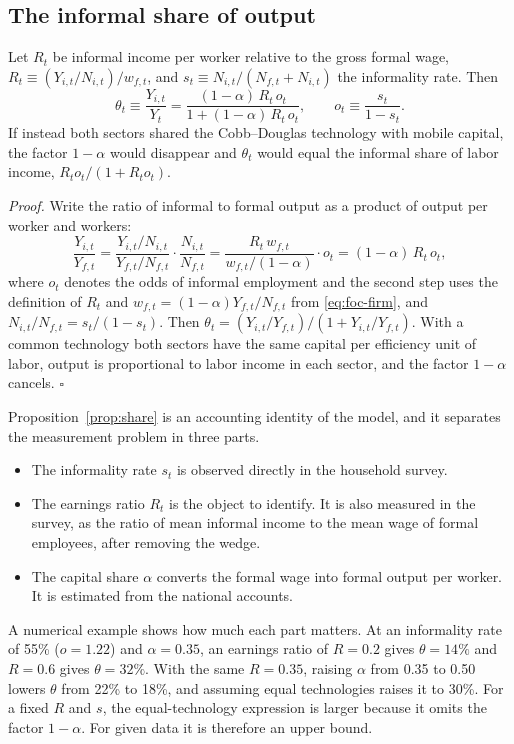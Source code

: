 \subsection{The informal share of output}

\begin{proposition}
\label{prop:share}
Let $R_t$ be informal income per worker relative to the gross formal wage, $R_t \equiv (Y_{i,t}/N_{i,t})/w_{f,t}$, and $s_t \equiv N_{i,t}/(N_{f,t}+N_{i,t})$ the informality rate. Then
\begin{equation}
\theta_t \equiv \frac{Y_{i,t}}{Y_t} = \frac{(1-\alpha)\,R_t\,o_t}{1+(1-\alpha)\,R_t\,o_t},\qquad o_t\equiv\frac{s_t}{1-s_t}.
\label{eq:share}
\end{equation}
If instead both sectors shared the Cobb--Douglas technology with mobile capital, the factor $1-\alpha$ would disappear and $\theta_t$ would equal the informal share of labor income, $R_to_t/(1+R_to_t)$.
\end{proposition}

\emph{Proof.} Write the ratio of informal to formal output as a product of output per worker and workers:
\[
\frac{Y_{i,t}}{Y_{f,t}} = \frac{Y_{i,t}/N_{i,t}}{Y_{f,t}/N_{f,t}}\cdot\frac{N_{i,t}}{N_{f,t}}
= \frac{R_t\,w_{f,t}}{w_{f,t}/(1-\alpha)}\cdot o_t = (1-\alpha)\,R_t\,o_t ,
\]
where $o_t$ denotes the odds of informal employment and the second step uses the definition of $R_t$ and $w_{f,t}=(1-\alpha)Y_{f,t}/N_{f,t}$ from \eqref{eq:foc-firm}, and $N_{i,t}/N_{f,t}=s_t/(1-s_t)$. Then $\theta_t = (Y_{i,t}/Y_{f,t})/(1+Y_{i,t}/Y_{f,t})$. With a common technology both sectors have the same capital per efficiency unit of labor, output is proportional to labor income in each sector, and the factor $1-\alpha$ cancels. $\square$

Proposition~\ref{prop:share} is an accounting identity of the model, and it separates the measurement problem in three parts.
\begin{itemize}
  \item The informality rate $s_t$ is observed directly in the household survey.
  \item The earnings ratio $R_t$ is the object to identify. It is also measured in the survey, as the ratio of mean informal income to the mean wage of formal employees, after removing the wedge.
  \item The capital share $\alpha$ converts the formal wage into formal output per worker. It is estimated from the national accounts.
\end{itemize}
A numerical example shows how much each part matters. At an informality rate of 55\% ($o=1.22$) and $\alpha=0.35$, an earnings ratio of $R=0.2$ gives $\theta=14\%$ and $R=0.6$ gives $\theta=32\%$. With the same $R=0.35$, raising $\alpha$ from 0.35 to 0.50 lowers $\theta$ from 22\% to 18\%, and assuming equal technologies raises it to 30\%. For a fixed $R$ and $s$, the equal-technology expression is larger because it omits the factor $1-\alpha$. For given data it is therefore an upper bound.

